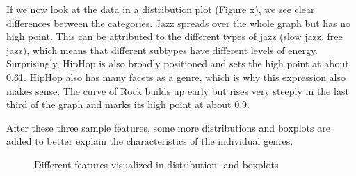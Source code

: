 If we now look at the data in a distribution plot (Figure x),
we see clear differences between the categories.
Jazz spreads over the whole graph but has no high point.
This can be attributed to the different types of jazz (slow jazz, free jazz),
which means that different subtypes have different levels of energy.
Surprisingly, HipHop is also broadly positioned and sets the high point at about 0.61.
HipHop also has many facets as a genre, which is why this expression also makes sense.
The curve of Rock builds up early but rises very steeply in the last third of the graph and marks
its high point at about 0.9. 

After these three sample features, some more distributions and boxplots are added to better
explain the characteristics of the individual genres.

\begin{figure}[H]
    \centering
    \qquad
    \qquad
    \qquad
    \qquad
    \qquad
    \qquad
    \qquad
    \qquad
    \caption{Different features visualized in distribution- and boxplots}%
    \label{fig:du_ds_bp_comparison}%
\end{figure}